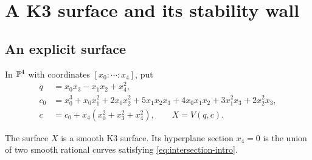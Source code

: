 \section{A K3 surface and its stability wall}\label{sec:k3}

\subsection{An explicit surface}

In $\mathbb P^4$ with coordinates $[x_0:\cdots:x_4]$, put
\begin{align}
q&=x_0x_3-x_1x_2+x_4^2,\nonumber\\
c_0&=x_0^3+x_0x_1^2+2x_0x_2^2+5x_1x_2x_3
       +4x_0x_1x_2+3x_1^2x_3+2x_2^2x_3,\label{eq:k3-polynomials}\\
c&=c_0+x_4(x_0^2+x_3^2+x_4^2),\qquad X=V(q,c).\nonumber
\end{align}

\begin{proposition}\label{prop:k3}
The surface $X$ is a smooth K3 surface. Its hyperplane section $x_4=0$
is the union of two smooth rational curves satisfying
\eqref{eq:intersection-intro}.
\end{proposition}

